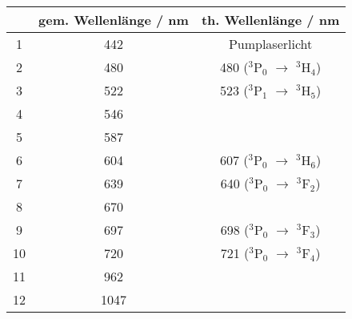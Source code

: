 \begin{center}
\begin{tabular}{|c|c|c|}
\hline
  & gem. Wellenlänge / nm & th. Wellenlänge / nm \cite{Versuchsanleitung} \\ \hline
1 & 442 & Pumplaserlicht \\ \hline
2 & 480 & 480 ($^3$P$_0$ $\rightarrow$ $^3$H$_4$) \\ \hline
3 & 522 & 523 ($^3$P$_1$ $\rightarrow$ $^3$H$_5$) \\ \hline
4 & 546 &  \\ \hline
5 & 587 &  \\ \hline
6 & 604 & 607 ($^3$P$_0$ $\rightarrow$ $^3$H$_6$) \\ \hline
7 & 639 & 640 ($^3$P$_0$ $\rightarrow$ $^3$F$_2$) \\ \hline
8 & 670 &  \\ \hline
9 & 697 & 698 ($^3$P$_0$ $\rightarrow$ $^3$F$_3$) \\ \hline
10 & 720 & 721 ($^3$P$_0$ $\rightarrow$ $^3$F$_4$) \\ \hline
11 & 962 &  \\ \hline
12 & 1047 &  \\ \hline
\end{tabular}
\end{center}